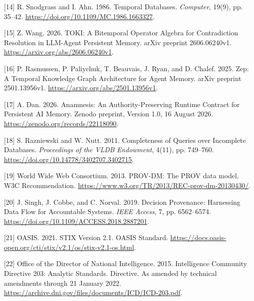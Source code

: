 \documentclass[acmlarge,nonacm]{acmart}
\newlength{\cslhangindent}
\newlength{\cslentryspacingunit} %
\newenvironment{CSLReferences}[2] %
 {\bibliofont %
  \setlength{\parindent}{0pt}
  \ifodd #1
  \let\oldpar\par
  \def\par{\hangindent=\cslhangindent\oldpar}
  \fi
  \setlength{\parskip}{#2\cslentryspacingunit}
 }%
 {}
\begin{document}
\begin{CSLReferences}{1}{1}
\leavevmode{}%
{[}14{]} R. Snodgrass and I. Ahn. 1986. Temporal Databases.
\emph{Computer}, 19(9), pp. 35--42.
\url{https://doi.org/10.1109/MC.1986.1663327}.

\leavevmode{}%
{[}15{]} Z. Wang. 2026. TOKI: A Bitemporal Operator Algebra for
Contradiction Resolution in LLM-Agent Persistent Memory. arXiv preprint
2606.06240v1. \url{https://arxiv.org/abs/2606.06240v1}.

\leavevmode{}%
{[}16{]} P. Rasmussen, P. Paliychuk, T. Beauvais, J. Ryan, and D.
Chalef. 2025. Zep: A Temporal Knowledge Graph Architecture for Agent
Memory. arXiv preprint 2501.13956v1.
\url{https://arxiv.org/abs/2501.13956v1}.

\leavevmode{}%
{[}17{]} A. Dan. 2026. Anamnesis: An Authority-Preserving Runtime
Contract for Persistent AI Memory. Zenodo preprint, Version 1.0, 16
August 2026. \url{https://zenodo.org/records/22118090}.

\leavevmode{}%
{[}18{]} S. Razniewski and W. Nutt. 2011. Completeness of Queries over
Incomplete Databases. \emph{Proceedings of the VLDB Endowment}, 4(11),
pp. 749--760. \url{https://doi.org/10.14778/3402707.3402715}.

\leavevmode{}%
{[}19{]} World Wide Web Consortium. 2013. PROV-DM: The PROV data model.
W3C Recommendation.
\url{https://www.w3.org/TR/2013/REC-prov-dm-20130430/}.

\leavevmode{}%
{[}20{]} J. Singh, J. Cobbe, and C. Norval. 2019. Decision Provenance:
Harnessing Data Flow for Accountable Systems. \emph{IEEE Access}, 7, pp.
6562--6574. \url{https://doi.org/10.1109/ACCESS.2018.2887201}.

\leavevmode{}%
{[}21{]} OASIS. 2021. STIX Version 2.1. OASIS Standard.
\url{https://docs.oasis-open.org/cti/stix/v2.1/os/stix-v2.1-os.html}.

\leavevmode{}%
{[}22{]} Office of the Director of National Intelligence. 2015.
Intelligence Community Directive 203: Analytic Standards. Directive. As
amended by technical amendments through 21 January 2022.
\url{https://archive.dni.gov/files/documents/ICD/ICD-203.pdf}.


\end{CSLReferences}
\end{document}
